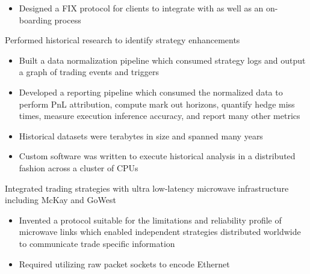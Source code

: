 \documentclass{report}
\begin{document}
\begin{table}
\begin{tabular}
{\begin{itemize}
                                         hundreds of clients worldwide
                                   \item Designed a FIX protocol for clients to integrate with as
                                         well as an on-boarding process
                               \end{itemize}
                         \item Performed historical research to identify strategy enhancements
                               \begin{itemize}
                                   \item Built a data normalization pipeline which consumed
                                         strategy logs and output a graph of trading events and
                                         triggers
                                   \item Developed a reporting pipeline which consumed the
                                         normalized data to perform PnL attribution, compute mark
                                         out horizons, quantify hedge miss times, measure execution
                                         inference accuracy, and report many other metrics
                                   \item Historical datasets were terabytes in size and spanned
                                         many years
                                   \item Custom software was written to execute historical analysis
                                         in a distributed fashion across a cluster of CPUs
                               \end{itemize}
                         \item Integrated trading strategies with ultra low-latency microwave
                               infrastructure including McKay and GoWest
                               \begin{itemize}
                                    \item Invented a protocol suitable for the limitations and
                                          reliability profile of microwave links which enabled
                                          independent strategies distributed worldwide to
                                          communicate trade specific information
                                    \item Required utilizing raw packet sockets to encode Ethernet

\end{itemize}}
\end{tabular}
\end{table}
\end{document}

